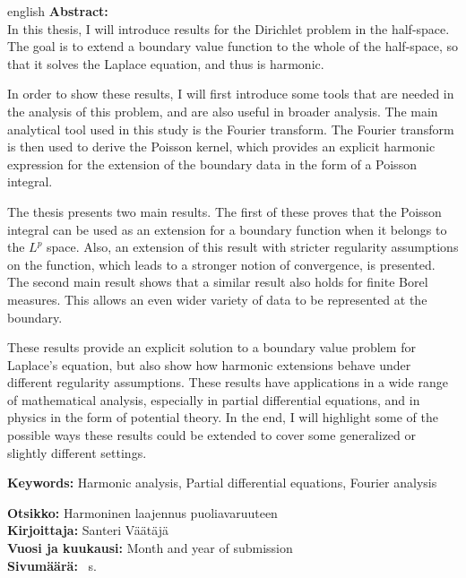 \documentclass[a4paper, 11pt]{report}
\theoremstyle{plain}
\theoremstyle{definition}
\theoremstyle{remark}
\begin{document}
\begin{foreignlanguage}{english}
\noindent\textbf{Abstract:}\\ %
In this thesis, I will introduce results for the Dirichlet problem in the half-space. The goal is to extend a boundary value function to the whole of the half-space, so that it solves the Laplace equation, and thus is harmonic.

In order to show these results, I will first introduce some tools that are needed in the analysis of this problem, and are also useful in broader analysis. The main analytical tool used in this study is the Fourier transform. The Fourier transform is then used to derive the Poisson kernel, which provides an explicit harmonic expression for the extension of the boundary data in the form of a Poisson integral.

The thesis presents two main results. The first of these proves that the Poisson integral can be used as an extension for a boundary function when it belongs to the $L^p$ space. Also, an extension of this result with stricter regularity assumptions on the function, which leads to a stronger notion of convergence, is presented. The second main result shows that a similar result also holds for finite Borel measures. This allows an even wider variety of data to be represented at the boundary.

These results provide an explicit solution to a boundary value problem for Laplace's equation, but also show how harmonic extensions behave under different regularity assumptions. These results have applications in a wide range of mathematical analysis, especially in partial differential equations, and in physics in the form of potential theory. In the end, I will highlight some of the possible ways these results could be extended to cover some generalized or slightly different settings.
\end{foreignlanguage}


\vfill

\noindent\textbf{Keywords:} Harmonic analysis, Partial differential equations, Fourier analysis %

\clearpage
\noindent\textbf{Otsikko:} Harmoninen laajennus puoliavaruuteen\\ %
\textbf{Kirjoittaja:} Santeri Väätäjä\\ %
\textbf{Vuosi ja kuukausi:} Month and year of submission\\ %
\textbf{Sivumäärä:} \pageref*{LastPage}~s.\\[1em] %
\end{document}
